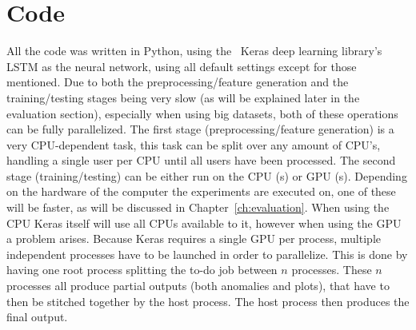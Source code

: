 \section{Code}
All the code was written in Python, using the~\cite{chollet2015keras} Keras deep learning library's LSTM as the neural network, using all default settings except for those mentioned. Due to both the preprocessing/feature generation and the training/testing stages being very slow (as will be explained later in the evaluation section), especially when using big datasets, both of these operations can be fully parallelized. The first stage (preprocessing/feature generation) is a very CPU-dependent task, this task can be split over any amount of CPU's, handling a single user per CPU until all users have been processed. The second stage (training/testing) can be either run on the CPU (s) or GPU (s). Depending on the hardware of the computer the experiments are executed on, one of these will be faster, as will be discussed in Chapter~\ref{ch:evaluation}. When using the CPU Keras itself will use all CPUs available to it, however when using the GPU a problem arises. Because Keras requires a single GPU per process, multiple independent processes have to be launched in order to parallelize. This is done by having one root process splitting the to-do job between \(n\) processes. These \(n\) processes all produce partial outputs (both anomalies and plots), that have to then be stitched together by the host process. The host process then produces the final output.